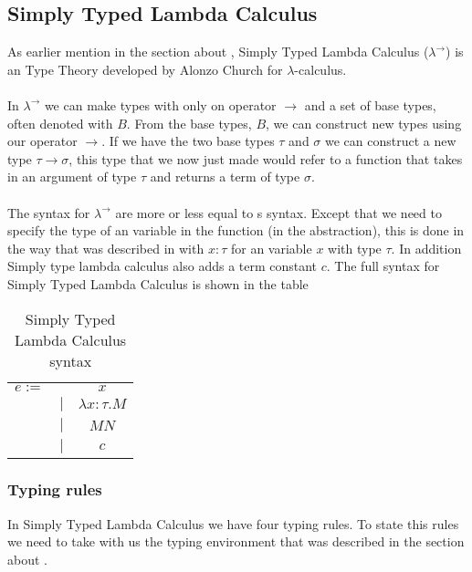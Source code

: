 \subsection{Simply Typed Lambda Calculus}
\label{Simply Typed Lambda Calculus}
As earlier mention in the section about , Simply Typed Lambda Calculus 
($\lambda^\rightarrow$) is an Type Theory developed by Alonzo Church for $\lambda$-calculus. \\ \\
In $\lambda^\rightarrow$ we can make types with only on operator $\rightarrow$ and a set of base types,
 often denoted with $B$. From the base types, $B$, we can construct new types using our operator 
 $\rightarrow$. If we have the two base types $\tau$ and $\sigma$ we can construct a new 
 type $\tau \rightarrow \sigma$, this type that we now just made would refer to a function 
 that takes in an argument of type $\tau$ and returns a term of type $\sigma$. \\ \\
The syntax for $\lambda^\rightarrow$ are more or less equal to s syntax. 
Except that we need to specify the type of an variable in the function (in the abstraction), 
this is done in the way that was described in  with $x:\tau$ for an variable $x$ with 
type $\tau$. In addition Simply type lambda calculus also adds a term constant $c$. The full syntax for 
Simply Typed Lambda Calculus is shown in the table  \\

\begin{table}[]
    \centering
    \begin{tabular}{c c c}
         $e :=$&  & $x$\\
         & $|$ & $\lambda x:\tau.M$ \\
         & $|$ &  $M N$ \\
         & $|$ &  $c$ \\
    \end{tabular}
    \caption{Simply Typed Lambda Calculus syntax}
    \label{tab:STLC syntax}
\end{table}

\subsubsection{Typing rules}
In Simply Typed Lambda Calculus we have four typing rules. To state this rules we need to take with us the typing environment 
that was described in the section about .

